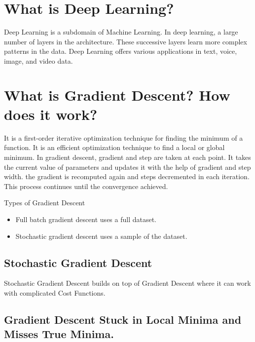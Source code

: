 \documentclass[
]{book}
\begin{document}
\hypertarget{what-is-deep-learning}{%
\section{What is Deep Learning?}\label{what-is-deep-learning}}

Deep Learning is a subdomain of Machine Learning. In deep learning, a large number of layers in the architecture. These successive layers learn more complex patterns in the data. Deep Learning offers various applications in text, voice, image, and video data.

\hypertarget{what-is-gradient-descent-how-does-it-work}{%
\section{What is Gradient Descent? How does it work?}\label{what-is-gradient-descent-how-does-it-work}}

It is a first-order iterative optimization technique for finding the minimum of a function. It is an efficient optimization technique to find a local or global minimum.
In gradient descent, gradient and step are taken at each point. It takes the current value of parameters and updates it with the help of gradient and step width. the gradient is recomputed again and steps decremented in each iteration. This process continues until the convergence achieved.

Types of Gradient Descent

\begin{itemize}
\item
  Full batch gradient descent uses a full dataset.
\item
  Stochastic gradient descent uses a sample of the dataset.
\end{itemize}

\hypertarget{stochastic-gradient-descent}{%
\subsection{Stochastic Gradient Descent}\label{stochastic-gradient-descent}}

Stochastic Gradient Descent builds on top of Gradient Descent where it can work with complicated Cost Functions.

\hypertarget{gradient-descent-stuck-in-local-minima-and-misses-true-minima.}{%
\subsection{Gradient Descent Stuck in Local Minima and Misses True Minima.}\label{gradient-descent-stuck-in-local-minima-and-misses-true-minima.}}
\end{document}
